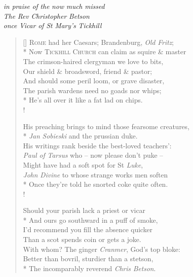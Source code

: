\begin{center}
\textit{in praise of the now much missed}\\
\textit{The Rev Christopher Betson}\\
\textit{once Vicar of St Mary's Tickhill}
\end{center}

\bigskip

\settowidth{\versewidth}{His preaching brings to mind those fearsome creatures,}
\begin{verse}[\versewidth]
\textsc{Rome} had her Caesars; Brandenburg, \textit{Old Fritz};\\*
\vin Now \textsc{Tickhill Church} can claim as squire \& master\\
The crimson-haired clergyman we love to bits,\\
\vin Our shield \& broadsword, friend \& pastor;\\
\vin And should some peril loom, or grave disaster,\\
The parish wardens need no goads nor whips;\\*
He's all over it like a fat lad on chips.\\!

His preaching brings to mind those fearsome creatures,\\*
\vin \textit{Jan Sobieski} and the prussian duke.\\
His writings rank beside the best-loved teachers':\\
\vin \textit{Paul of Tarsus} who -- now please don't puke --\\
\vin Might have had a soft spot for St \textit{Luke},\\
\textit{John Divine} to whose strange works men soften\\*
Once they're told he snorted coke quite often.\\!

Should your parish lack a priest or vicar\\*
\vin And ours go southward in a puff of smoke,\\
I'd recommend you fill the absence quicker\\
\vin Than a scot spends coin or gets a joke.\\
\vin With whom? The ginger \textit{Cranmer}, God's top bloke:\\
Better than bovril, sturdier than a stetson,\\*
The incomparably reverend \textit{Chris Betson}.
\end{verse}
